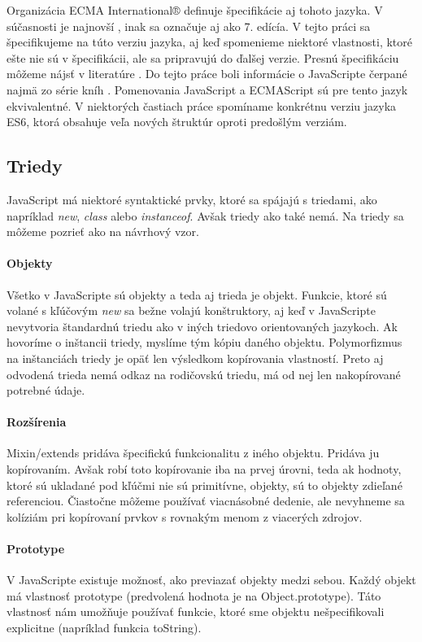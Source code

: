 Organizácia {ECMA International®} definuje špecifikácie aj tohoto jazyka. V súčasnosti je najnovší \JS{}, inak sa označuje aj ako 7. edícía. V tejto práci sa špecifikujeme na túto verziu jazyka, aj keď spomenieme niektoré vlastnosti, ktoré ešte nie sú v špecifikácii, ale sa pripravujú do ďalšej verzie. Presnú špecifikáciu môžeme nájsť v literatúre \cite[\JS{}]{ECMAScript}.
Do tejto práce boli informácie o JavaScripte čerpané najmä zo série kníh \cite[You Don't Know JS]{youDontKnowJS1, youDontKnowJS2, youDontKnowJS3, youDontKnowJS4, youDontKnowJS5, youDontKnowJS6}.
Pomenovania JavaScript a ECMAScript sú pre tento jazyk ekvivalentné.
V niektorých častiach práce spomíname konkrétnu verziu jazyka ES6, ktorá obsahuje veľa nových štruktúr oproti predošlým verziám.

\subsection{Triedy}
JavaScript má niektoré syntaktické prvky, ktoré sa spájajú s triedami, ako napríklad \emph{new}, \emph{class} alebo \emph{instanceof}. Avšak triedy ako také nemá. Na triedy sa môžeme pozrieť ako na návrhový vzor. 

\paragraph{Objekty}
Všetko v JavaScripte sú objekty a teda aj trieda je objekt. Funkcie, ktoré sú volané s kľúčovým \emph{new} sa bežne volajú konštruktory, aj keď v JavaScripte nevytvoria štandardnú triedu ako v iných triedovo orientovaných jazykoch. 
Ak hovoríme o inštancii triedy, myslíme tým kópiu daného objektu. Polymorfizmus na inštanciách triedy je opäť len výsledkom kopírovania vlastností. Preto aj odvodená trieda nemá odkaz na rodičovskú triedu, má od nej len nakopírované potrebné údaje.

\paragraph{Rozšírenia}
Mixin/extends pridáva špecifickú funkcionalitu z iného objektu. Pridáva ju kopírovaním. Avšak robí toto kopírovanie iba na prvej úrovni, teda ak hodnoty, ktoré sú ukladané pod kľúčmi nie sú primitívne, objekty, sú to objekty zdieľané referenciou. Čiastočne môžeme používať viacnásobné dedenie, ale nevyhneme sa kolíziám pri kopírovaní prvkov s rovnakým menom z viacerých zdrojov.

\paragraph{Prototype}
V JavaScripte existuje možnosť, ako previazať objekty medzi sebou. Každý objekt má vlastnosť prototype (predvolená hodnota je na Object.prototype). Táto vlastnosť nám umožňuje používať funkcie, ktoré sme objektu nešpecifikovali explicitne (napríklad funkcia toString).

